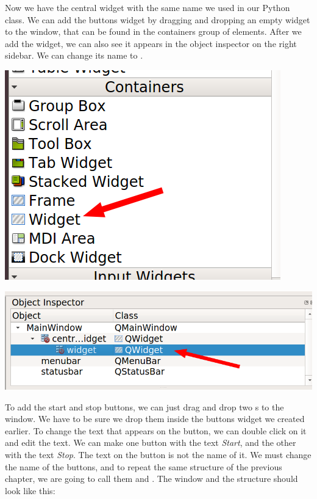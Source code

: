 Now we have the central widget with the same name we used in our Python class. We can add the buttons widget by dragging and dropping an empty widget to the window, that can be found in the containers group of elements. After we add the widget, we can also see it appears in the object inspector on the right sidebar. We can change its name to .

\begin{minipage}{0.45\linewidth}
    \centering
    \includegraphics[width=\textwidth]{images/Chapter_09/04_empty_widget.png}
\end{minipage}
\hspace{0.5cm}
\begin{minipage}{0.45\linewidth}
    \centering
    \includegraphics[width=\textwidth]{images/Chapter_09/04_empty_widget_structure.png}
\end{minipage}

To add the start and stop buttons, we can just drag and drop two s to the window. We have to be sure we drop them inside the buttons widget we created earlier. To change the text that appears on the button, we can double click on it and edit the text. We can make one button with the text \emph{Start}, and the other with the text \emph{Stop}. The text on the button is not the name of it. We must change the name of the buttons, and to repeat the same structure of the previous chapter, we are going to call them  and . The window and the structure should look like this:

